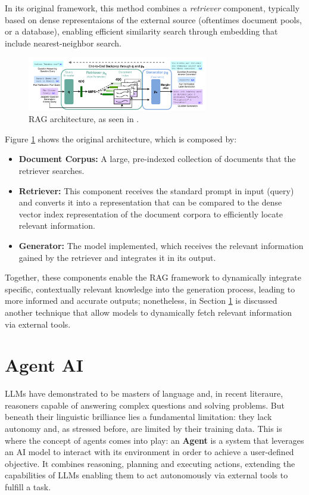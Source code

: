 In its original framework, this method combines a \textit{retriever} component, typically based on dense representaions of the external source (oftentimes document pools, or a database), enabling efficient similarity search through embedding that include nearest-neighbor search.

\begin{figure}[h]
    \centering
    \includegraphics[width=0.7\textwidth]{images/rag-components.png}
    \caption{RAG architecture, as seen in \cite{lewis2020retrieval}.}
    \label{fig:rag}
\end{figure}

Figure \ref{fig:rag} shows the original architecture, which is composed by:

\begin{itemize}
    \item \textbf{Document Corpus:} A large, pre-indexed collection of documents that the retriever searches.
    \item \textbf{Retriever:} This component receives the standard prompt in input (query) and converts it into a representation that can be compared to the dense vector index representation of the document corpora to efficiently locate relevant information.
    \item \textbf{Generator:} The model implemented, which receives the relevant information gained by the retriever and integrates it in its output.
\end{itemize}

Together, these components enable the RAG framework to dynamically integrate specific, contextually relevant knowledge into the generation process, leading to more informed and accurate outputs; nonetheless, in Section \ref{sec:agent-ai} is discussed another technique that allow models to dynamically fetch relevant information via external tools.




\section{Agent AI}
\label{sec:agent-ai}

LLMs have demonstrated to be masters of language and, in recent literaure, reasoners capable of answering complex questions and solving problems. But beneath their linguistic brilliance lies a fundamental limitation: they lack autonomy and, as stressed before, are limited by their training data. This is where the concept of agents comes into play: an \textbf{Agent} is a system that leverages an AI model to interact with its environment in order to achieve a user-defined objective. It combines reasoning, planning and executing actions, extending the capabilities of LLMs enabling them to act autonomously via external tools to fulfill a task.


